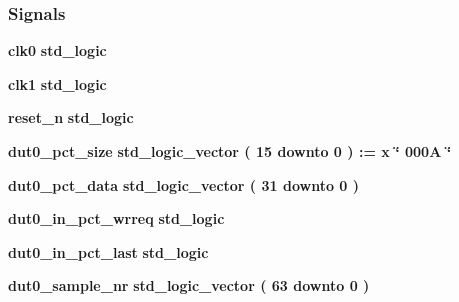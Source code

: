 \subsubsection*{Signals}
 \begin{DoxyCompactItemize}
\item 
{\bf clk0} {\bfseries \textcolor{comment}{std\+\_\+logic}\textcolor{vhdlchar}{ }} 
\item 
{\bf clk1} {\bfseries \textcolor{comment}{std\+\_\+logic}\textcolor{vhdlchar}{ }} 
\item 
{\bf reset\+\_\+n} {\bfseries \textcolor{comment}{std\+\_\+logic}\textcolor{vhdlchar}{ }} 
\item 
{\bf dut0\+\_\+pct\+\_\+size} {\bfseries \textcolor{comment}{std\+\_\+logic\+\_\+vector}\textcolor{vhdlchar}{ }\textcolor{vhdlchar}{(}\textcolor{vhdlchar}{ }\textcolor{vhdlchar}{ } \textcolor{vhdldigit}{15} \textcolor{vhdlchar}{ }\textcolor{keywordflow}{downto}\textcolor{vhdlchar}{ }\textcolor{vhdlchar}{ } \textcolor{vhdldigit}{0} \textcolor{vhdlchar}{ }\textcolor{vhdlchar}{)}\textcolor{vhdlchar}{ }\textcolor{vhdlchar}{ }\textcolor{vhdlchar}{ }\textcolor{vhdlchar}{\+:}\textcolor{vhdlchar}{=}\textcolor{vhdlchar}{ }\textcolor{vhdlchar}{ }\textcolor{vhdlchar}{x}\textcolor{vhdlchar}{ }\textcolor{keyword}{\char`\"{} 000\+A \char`\"{}}\textcolor{vhdlchar}{ }} 
\item 
{\bf dut0\+\_\+pct\+\_\+data} {\bfseries \textcolor{comment}{std\+\_\+logic\+\_\+vector}\textcolor{vhdlchar}{ }\textcolor{vhdlchar}{(}\textcolor{vhdlchar}{ }\textcolor{vhdlchar}{ } \textcolor{vhdldigit}{31} \textcolor{vhdlchar}{ }\textcolor{keywordflow}{downto}\textcolor{vhdlchar}{ }\textcolor{vhdlchar}{ } \textcolor{vhdldigit}{0} \textcolor{vhdlchar}{ }\textcolor{vhdlchar}{)}\textcolor{vhdlchar}{ }} 
\item 
{\bf dut0\+\_\+in\+\_\+pct\+\_\+wrreq} {\bfseries \textcolor{comment}{std\+\_\+logic}\textcolor{vhdlchar}{ }} 
\item 
{\bf dut0\+\_\+in\+\_\+pct\+\_\+last} {\bfseries \textcolor{comment}{std\+\_\+logic}\textcolor{vhdlchar}{ }} 
\item 
{\bf dut0\+\_\+sample\+\_\+nr} {\bfseries \textcolor{comment}{std\+\_\+logic\+\_\+vector}\textcolor{vhdlchar}{ }\textcolor{vhdlchar}{(}\textcolor{vhdlchar}{ }\textcolor{vhdlchar}{ } \textcolor{vhdldigit}{63} \textcolor{vhdlchar}{ }\textcolor{keywordflow}{downto}\textcolor{vhdlchar}{ }\textcolor{vhdlchar}{ } \textcolor{vhdldigit}{0} \textcolor{vhdlchar}{ }\textcolor{vhdlchar}{)}\textcolor{vhdlchar}{ }} 
\item 

\end{DoxyCompactItemize}
